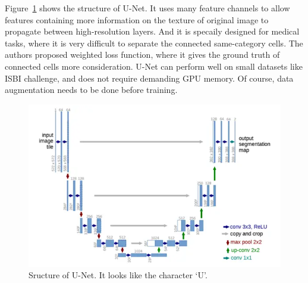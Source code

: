 Figure~\ref{fig:unets} shows the structure of U-Net. It uses many feature channels to allow features containing more information on the texture of original image to propagate between high-resolution layers. And it is specaily designed for medical tasks, where it is very difficult to separate the connected same-category cells. The authors proposed weighted loss function, where it gives the ground truth of connected cells more consideration. U-Net can perform well on small datasets like ISBI challenge, and does not require demanding GPU memory. Of course, data augmentation needs to be done before training.

\begin{figure}[!htpb]
    \centering
    \includegraphics[scale=0.4]{figuras/unet.PNG}
    \caption{Sructure of U-Net. It looks like the character `U'. }
    \label{fig:unets}
\end{figure}